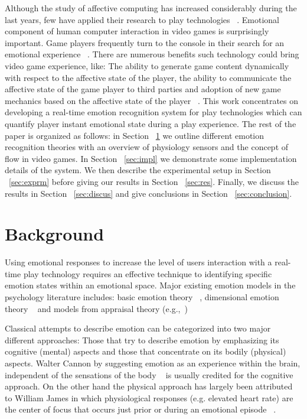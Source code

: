 \documentclass[conference]{IEEEtran}
\begin{document}
Although the study of affective computing has increased considerably during the last years, few have applied their research to play technologies ~\cite{sykes2003affective}. Emotional component of human computer interaction in video games is surprisingly important. Game players frequently turn to the console in their search for an emotional experience ~\cite{rouse2010game}. There are numerous benefits such technology could bring video game experience, like: The ability to generate game content dynamically with respect to the affective state of the player, the ability to communicate the affective state of the game player to third parties and adoption of new game mechanics based on the affective state of the player ~\cite{sykes2003affective}. This work concentrates on developing a real-time emotion recognition system for play technologies which can quantify player instant emotional state during a play experience. The rest of the paper is organized as follows: in Section ~\ref{sec:lit-review} we outline different emotion recognition theories with an overview of physiology sensors and the concept of flow in video games. In Section ~\ref{sec:impl} we demonstrate some implementation details of the system. We then describe the experimental setup in Section ~\ref{sec:exprm} before giving our results in Section ~\ref{sec:res}. Finally, we discuss the results in Section ~\ref{sec:discus} and give conclusions in Section ~\ref{sec:conclusion}.


\section{Background}
\label{sec:lit-review}

Using emotional responses to increase the level of users interaction with a real-time play technology requires an effective technique to identifying specific emotion states within an emotional space. Major existing emotion models in the psychology literature includes: basic emotion theory ~\cite{ekman1992argument, ekman1992there}, dimensional emotion theory ~\cite{lang1995emotion, russell1980circumplex} and models from appraisal theory (e.g.,~\cite{roseman2001model}) ~\cite{zhang2010service}

Classical attempts to describe emotion can be categorized into two major different approaches: Those that try to describe emotion by emphasizing its cognitive (mental) aspects and those that concentrate on its bodily (physical) aspects. Walter Cannon by suggesting emotion as an experience within the brain, independent of the sensations of the body ~\cite{cannon1927james} is usually credited for the cognitive approach. On the other hand the physical approach has largely been attributed to William James in which physiological responses (e.g. elevated heart rate) are the center of focus that occurs just prior or during an emotional episode ~\cite{paiva2007affective}.
\end{document}
